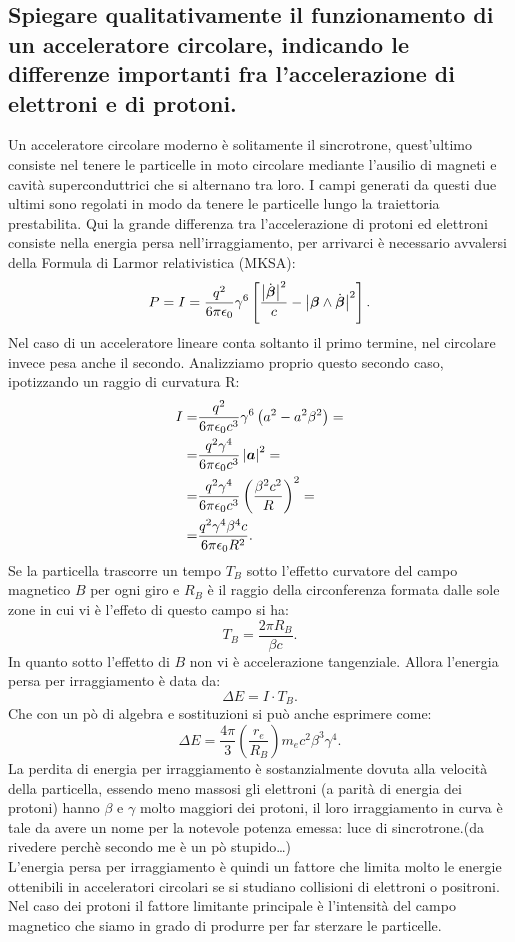 \subsection[\hspace{1mm} Funzionamento di acceleratore cicolare]{Spiegare qualitativamente il funzionamento di un acceleratore circolare, indicando le differenze importanti fra l’accelerazione di elettroni e di protoni.}
\label{sec:3.a.21}
Un acceleratore circolare moderno è solitamente il sincrotrone, quest'ultimo consiste nel tenere le particelle in moto circolare mediante l'ausilio di magneti e cavità superconduttrici che si alternano tra loro. I campi generati da questi due ultimi sono regolati in modo da tenere le particelle lungo la traiettoria prestabilita.
Qui la grande differenza tra l'accelerazione di protoni ed elettroni consiste nella energia persa nell'irraggiamento, per arrivarci è necessario avvalersi della Formula di Larmor relativistica (MKSA):
\[
	P=I= \frac{q^2}{6\pi \epsilon_0 } \gamma^6\left[  \frac{\left|\dot{\boldsymbol{\beta}} \right|^2}{c}-  \left| \boldsymbol{\beta}\wedge \dot{\boldsymbol{\beta}}  \right| ^2  \right] 
.\] \label{eq:Larmor}
Nel caso di un acceleratore lineare conta soltanto il primo termine, nel circolare invece pesa anche il secondo. Analizziamo proprio questo secondo caso, ipotizzando un raggio di curvatura R:
\begin{align*}
	I= &\frac{q^2}{6\pi \epsilon_0 c^3} \gamma^6 \left( a^2-a^2\beta^2  \right)=\\
	=&\frac{q^2\gamma^4}{6\pi \epsilon_0 c^3}\left| \boldsymbol{a} \right|^2 =\\
	=& \frac{q^2\gamma^4}{6\pi \epsilon_0c^3}\left( \frac{\beta^2c^2}{R} \right) ^2=\\
	=&\frac{q^2\gamma^4\beta^4c}{6\pi \epsilon_0R^2}
.\end{align*}
Se la particella trascorre un tempo $T_B$ sotto l'effetto curvatore del campo magnetico $B$ per ogni giro e $R_B$ è il raggio della circonferenza formata dalle sole zone in cui vi è l'effeto di questo campo si ha:
\[
	T_B = \frac{2\pi R_B}{\beta c}
.\] 
In quanto sotto l'effetto di $B$ non vi è accelerazione tangenziale. Allora l'energia persa per irraggiamento è data da:
\[
	\Delta E = I\cdot T_B
.\] 
Che con un pò di algebra e sostituzioni si può anche esprimere come:
\[
	\Delta E = \frac{4\pi}{3}\left( \frac{r_e}{R_B} \right) m_ec^2\beta^3\gamma^4  	
.\] 
La perdita di energia per irraggiamento è sostanzialmente dovuta alla velocità della particella, essendo meno massosi gli elettroni (a parità di energia dei protoni) hanno $\beta$ e $\gamma$ molto maggiori dei protoni, il loro irraggiamento in curva è tale da avere un nome per la notevole potenza emessa: luce di sincrotrone.(da rivedere perchè secondo me è un pò stupido\ldots)\\
L'energia persa per irraggiamento è quindi un fattore che limita molto le energie ottenibili in acceleratori circolari se si studiano collisioni di elettroni o positroni. Nel caso dei protoni il fattore limitante principale è l'intensità del campo magnetico che siamo in grado di produrre per far sterzare le particelle.



